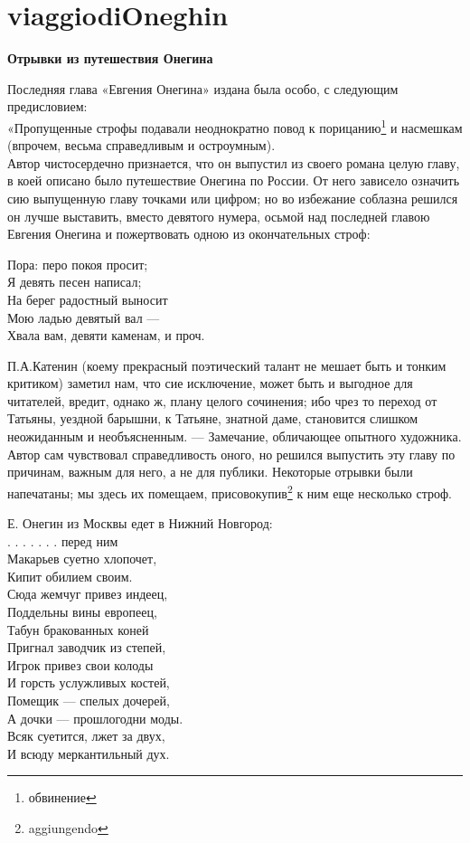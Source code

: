 \chapter{viaggiodiOneghin}\label{section:Viaggio}

\textbf{Отрывки из путешествия Онегина}

Последняя глава «Евгения Онегина» издана была особо, с следующим предисловием:\\
«Пропущенные строфы подавали неоднократно повод к порицанию\footnote{обвинение} и насмешкам (впрочем, весьма справедливым и остроумным).\\
Автор чистосердечно признается, что он выпустил из своего романа целую главу, в коей описано было путешествие Онегина по России. От него зависело означить сию выпущенную главу точками или цифром; но во избежание соблазна решился он лучше выставить, вместо девятого нумера, осьмой над последней главою Евгения Онегина и пожертвовать одною из окончательных строф:

Пора: перо покоя просит;\\
Я девять песен написал;\\
На берег радостный выносит\\
Мою ладью девятый вал —\\
Хвала вам, девяти каменам, и проч.

П.А.Катенин (коему прекрасный поэтический талант не мешает быть и тонким критиком) заметил нам, что сие исключение, может быть и выгодное для читателей, вредит, однако ж, плану целого сочинения; ибо чрез то переход от Татьяны, уездной барышни, к Татьяне, знатной даме, становится слишком неожиданным и необъясненным. — Замечание, обличающее опытного художника. Автор сам чувствовал справедливость оного, но решился выпустить эту главу по причинам, важным для него, а не для публики. Некоторые отрывки были напечатаны; мы здесь их помещаем, присовокупив\footnote{aggiungendo} к ним еще несколько строф.

Е. Онегин из Москвы едет в Нижний Новгород:\\
. . . . . . . перед ним\\
Макарьев суетно хлопочет,\\
Кипит обилием своим.\\
Сюда жемчуг привез индеец,\\
Поддельны вины европеец,\\
Табун бракованных коней\\
Пригнал заводчик из степей,\\
Игрок привез свои колоды\\
И горсть услужливых костей,\\
Помещик — спелых дочерей,\\
А дочки — прошлогодни моды.\\
Всяк суетится, лжет за двух,\\
И всюду меркантильный дух.

